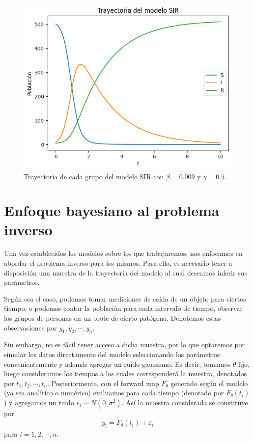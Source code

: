 \begin{figure}
    \centering
    \includegraphics[width = 10 cm]{img/trayectoria_SIR.png}
    \caption{Trayectoria de cada grupo del modelo SIR con $\beta = 0.009$ y $\gamma = 0.5$.}
    \label{fig:trayectoria_SIR}
\end{figure}




\section{Enfoque bayesiano al problema inverso}

Una vez establecidos los modelos sobre los que trabajaremos, nos enfocamos en abordar el problema inverso para los mismos. Para ello, es necesario tener a disposición una muestra de la trayectoria del modelo al cual deseamos inferir sus parámetros.

Según sea el caso, podemos tomar mediciones de caída de un objeto para ciertos tiempo, o podemos contar la población para cada intervalo de tiempo, observar los grupos de personas en un brote de cierto patógeno. Denotemos estas observaciones por $y_1, y_2, \cdots, y_n$. 

Sin embargo, no es fácil tener acceso a dicha muestra, por lo que optaremos por simular los datos directamente del modelo seleccionando los parámetros convenientemente y además agregar un ruido gaussiano. Es decir, tomamos $\theta$ fijo, luego consideramos los tiempos a los cuales corresponderá la muestra, denotados por $t_1, t_2, \cdots, t_n$. Posteriormente, con el forward map $F_{\theta}$ generado según el modelo (ya sea analítico o numérico) evaluamos para cada tiempo (denotado por $F_{\theta}(t_i)$) y agregamos un ruido $\varepsilon_i \sim N(0,\sigma^2)$. Así la muestra considerada se constituye por
\begin{align}
    y_i = F_{\theta}(t_i) + \varepsilon_i %
\end{align}
para $i = 1,2, \cdots, n$. 

